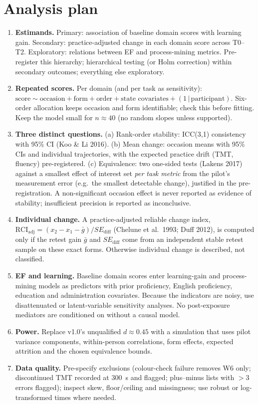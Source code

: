 \documentclass[11pt,a4paper]{article}
\begin{document}
\section{Analysis plan}
\begin{enumerate}
\item \textbf{Estimands.} Primary: association of baseline domain scores with learning gain. Secondary: practice-adjusted change in each domain score across T0--T2. Exploratory: relations between EF and process-mining metrics. Pre-register this hierarchy; hierarchical testing (or Holm correction) within secondary outcomes; everything else exploratory.
\item \textbf{Repeated scores.} Per domain (and per task as sensitivity): $\text{score} \sim \text{occasion} + \text{form} + \text{order} + \text{state covariates} + (1\,|\,\text{participant})$. Six-order allocation keeps occasion and form identifiable; check this before fitting. Keep the model small for $n\approx40$ (no random slopes unless supported).
\item \textbf{Three distinct questions.} (a) Rank-order stability: ICC(3,1) consistency with 95\% CI (Koo \& Li 2016). (b) Mean change: occasion means with 95\% CIs and individual trajectories, with the expected practice drift (TMT, fluency) pre-registered. (c) Equivalence: two one-sided tests (Lakens 2017) against a smallest effect of interest set \emph{per task metric} from the pilot's measurement error (e.g.\ the smallest detectable change), justified in the pre-registration. A non-significant occasion effect is never reported as evidence of stability; insufficient precision is reported as inconclusive.
\item \textbf{Individual change.} A practice-adjusted reliable change index, $\text{RCI}_{\text{adj}} = (x_2-x_1-\bar g)/SE_{\text{diff}}$ (Chelune et al.\ 1993; Duff 2012), is computed only if the retest gain $\bar g$ and $SE_{\text{diff}}$ come from an independent stable retest sample on these exact forms. Otherwise individual change is described, not classified.
\item \textbf{EF and learning.} Baseline domain scores enter learning-gain and process-mining models as predictors with prior proficiency, English proficiency, education and administration covariates. Because the indicators are noisy, use disattenuated or latent-variable sensitivity analyses. No post-exposure mediators are conditioned on without a causal model.
\item \textbf{Power.} Replace v1.0's unqualified $d\approx0.45$ with a simulation that uses pilot variance components, within-person correlations, form effects, expected attrition and the chosen equivalence bounds.
\item \textbf{Data quality.} Pre-specify exclusions (colour-check failure removes W6 only; discontinued TMT recorded at 300~s and flagged; plus--minus lists with $>3$ errors flagged); inspect skew, floor/ceiling and missingness; use robust or log-transformed times where needed.
\end{enumerate}
\end{document}
